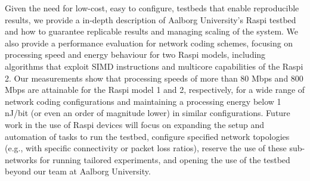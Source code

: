 \label{sec:conclusions}
Given the need for low-cost, easy to configure, testbeds that enable
reproducible results, we provide a in-depth description of Aalborg
University's \ac{Raspi} testbed and how to guarantee replicable
results and managing scaling of the system.  We also provide a
performance evaluation for network coding schemes, focusing on
processing speed and energy behaviour for two \ac{Raspi} models,
including algorithms that exploit \ac{SIMD} instructions and multicore
capabilities of the \ac{Raspi} 2. Our measurements show that
processing speeds of more than 80 Mbps and 800 Mbps are attainable for
the \ac{Raspi} model 1 and 2, respectively, for a wide range of
network coding configurations and maintaining a processing energy
below 1 nJ/bit (or even an order of magnitude lower) in similar
configurations. Future work in the use of \ac{Raspi} devices will
focus on expanding the setup and automation of tasks to run the
testbed, configure specified network topologies (e.g., with specific
connectivity or packet loss ratios), reserve the use of these
sub-networks for running tailored experiments, and opening the use of
the testbed beyond our team at Aalborg University.
